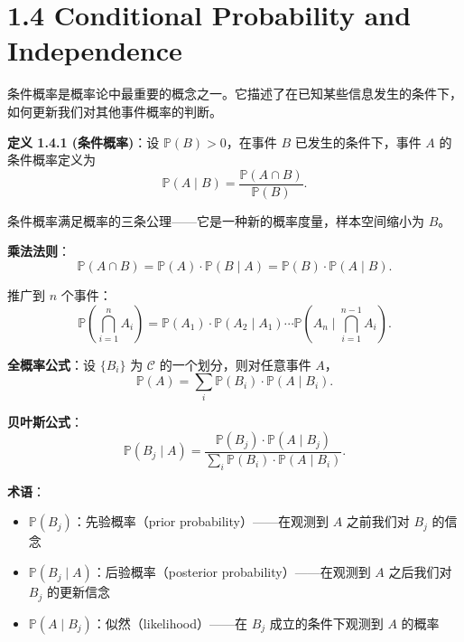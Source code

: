 \section{1.4 Conditional Probability and Independence}\label{sec:1.4}

条件概率是概率论中最重要的概念之一。它描述了在已知某些信息发生的条件下，如何更新我们对其他事件概率的判断。

\begin{remark}
\textbf{定义 1.4.1 (条件概率)}：设 $\mathbb{P}(B) > 0$，在事件 $B$ 已发生的条件下，事件 $A$ 的条件概率定义为
\[
\mathbb{P}(A \mid B) = \frac{\mathbb{P}(A \cap B)}{\mathbb{P}(B)}.
\label{eq:conditional-prob-ch1}
\]
\end{remark}

条件概率满足概率的三条公理——它是一种新的概率度量，样本空间缩小为 $B$。

\textbf{乘法法则}：
\[
\mathbb{P}(A \cap B) = \mathbb{P}(A) \cdot \mathbb{P}(B \mid A) = \mathbb{P}(B) \cdot \mathbb{P}(A \mid B).
\label{eq:multiplication-rule-ch1}
\]

推广到 $n$ 个事件：
\[
\mathbb{P}\left(\bigcap_{i=1}^{n} A_i\right) = \mathbb{P}(A_1) \cdot \mathbb{P}(A_2 \mid A_1) \cdots \mathbb{P}\left(A_n \mid \bigcap_{i=1}^{n-1} A_i\right).
\label{eq:multiplication-n-ch1}
\]

\begin{remark}
\textbf{全概率公式}：设 $\{B_i\}$ 为 $\mathcal{C}$ 的一个划分，则对任意事件 $A$，
\[
\mathbb{P}(A) = \sum_i \mathbb{P}(B_i) \cdot \mathbb{P}(A \mid B_i).
\label{eq:total-probability-ch1}
\]
\end{remark}

\begin{remark}
\textbf{贝叶斯公式}：
\[
\mathbb{P}(B_j \mid A) = \frac{\mathbb{P}(B_j) \cdot \mathbb{P}(A \mid B_j)}{\sum_i \mathbb{P}(B_i) \cdot \mathbb{P}(A \mid B_i)}.
\label{eq:bayes-ch1}
\]

\textbf{术语}：
\begin{itemize}
    \item $\mathbb{P}(B_j)$：先验概率（prior probability）——在观测到 $A$ 之前我们对 $B_j$ 的信念
    \item $\mathbb{P}(B_j \mid A)$：后验概率（posterior probability）——在观测到 $A$ 之后我们对 $B_j$ 的更新信念
    \item $\mathbb{P}(A \mid B_j)$：似然（likelihood）——在 $B_j$ 成立的条件下观测到 $A$ 的概率
\end{itemize}
\end{remark}

